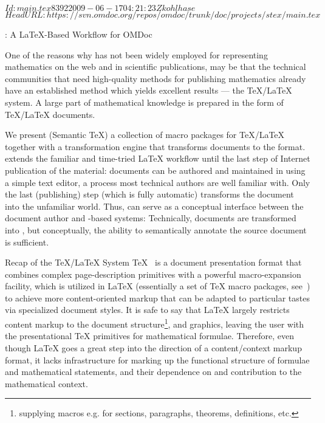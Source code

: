 \svnInfo $Id: main.tex 8392 2009-06-17 04:21:23Z kohlhase $
\svnKeyword $HeadURL: https://svn.omdoc.org/repos/omdoc/trunk/doc/projects/stex/main.tex $

\begin{omgroup}[id=stex,creators=miko]
  {\protect\stex: A \texorpdfstring{\LaTeX}{LaTeX}-Based Workflow for OMDoc}

One of the reasons why {\omdoc} has not been widely employed for representing mathematics
on the web and in scientific publications, may be that the technical communities that need
high-quality methods for publishing mathematics already have an established method which
yields excellent results --- the {\TeX/\LaTeX} system. A large part of mathematical
knowledge is prepared in the form of {\TeX}/{\LaTeX} documents.

We present {\stex} (Semantic {\TeX}) a collection of macro packages for {\TeX/\LaTeX}
together with a transformation engine that transforms {\stex} documents to the {\omdoc}
format. {\stex} extends the familiar and time-tried {\LaTeX} workflow until the last step
of Internet publication of the material: documents can be authored and maintained in
{\stex} using a simple text editor, a process most technical authors are well familiar
with. Only the last (publishing) step (which is fully automatic) transforms the document
into the unfamiliar {\xml} world. Thus, {\stex} can serve as a conceptual interface
between the document author and {\omdoc}-based systems: Technically, {\stex} documents are
transformed into {\omdoc}, but conceptually, the ability to semantically annotate the
source document is sufficient.

\begin{omgroup}{Recap of the {\TeX/\LaTeX} System}
{\TeX}~\cite{Knuth:ttb84} is a document presentation format that combines complex
page-description primitives with a powerful macro-expansion facility, which is utilized in
{\LaTeX} (essentially a set of {\TeX} macro packages, see~\cite{Lamport:ladps94}) to
achieve more content-oriented markup that can be adapted to particular tastes via
specialized document styles. It is safe to say that {\LaTeX} largely restricts content
markup to the document structure\footnote{supplying macros e.g. for sections, paragraphs,
  theorems, definitions, etc.}, and graphics, leaving the user with the presentational
{\TeX} primitives for mathematical formulae. Therefore, even though {\LaTeX} goes a great
step into the direction of a content/context markup format, it lacks infrastructure for
marking up the functional structure of formulae and mathematical statements, and their
dependence on and contribution to the mathematical context.
 

\end{omgroup}
\end{omgroup}
